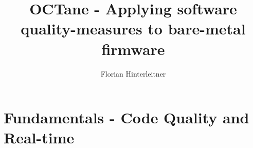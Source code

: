 \documentclass[master,english,smartquotes,apa]{hgbthesis}
\title{OCTane - Applying software quality-measures to bare-metal firmware}
\author{Florian Hinterleitner}
\newcommand{\TODO}[1]{\textcolor{red}{\textbf{ToDo:} #1}}
\begin{document}
\frontmatter                                   %
\maketitle

\tableofcontents

		
			

\mainmatter                                    %



\chapter{Fundamentals - Code Quality and Real-time}
\label{cha:Fundamentals}
\end{document}

